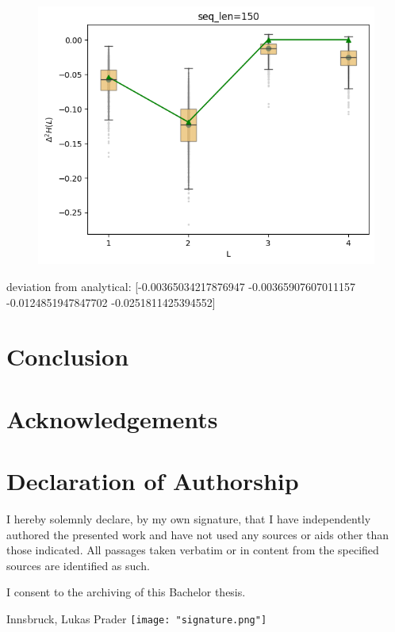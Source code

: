 \documentclass[12pt,a4paper]{article}
\begin{document}
\begin{figure}
    \centering
    \includegraphics[width=0.5\linewidth]{../figures/predictability_gain_estimation_optimal.png}
\end{figure}

deviation from analytical:
[-0.00365034217876947 -0.00365907607011157 -0.0124851947847702
-0.0251811425394552]

\section{Conclusion} \label{sec:conclusion}


\section{Acknowledgements} \label{sec:acknowledgements}


\clearpage
\section*{Declaration of Authorship}

I hereby solemnly declare, by my own signature, that I have independently authored the presented work and have not used any sources or aids other than those indicated. All passages taken verbatim or in content from the specified sources are identified as such.

I consent to the archiving of this Bachelor thesis.

\hfill
\vspace{2cm} Innsbruck, \findate \hfill Lukas Prader \texttt{[image: "signature.png"]}


\newpage
\printbibliography[]

\end{document}
